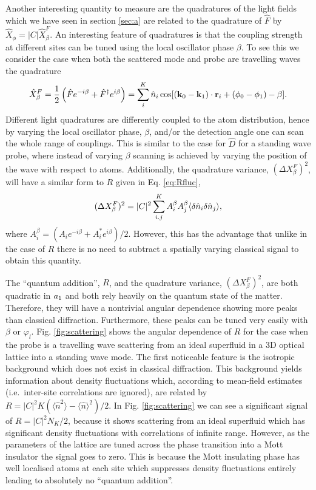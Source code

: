 Another interesting quantity to measure are the quadratures of the
light fields which we have seen in section \ref{sec:a} are related to
the quadrature of $\hat{F}$ by $\hat{X}_\phi = |C|
\hat{X}^F_\beta$. An interesting feature of quadratures is that the
coupling strength at different sites can be tuned using the local
oscillator phase $\beta$. To see this we consider the case when both
the scattered mode and probe are travelling waves the quadrature
\begin{equation} 
  \label{eq:Xtrav}
  \hat{X}^F_\beta = \frac{1}{2} \left( \hat{F} e^{-i \beta} +
    \hat{F}^\dagger e^{i \beta} \right) = \sum_i^K \hat{n}_i\cos[(\mathbf{k}_0 - \mathbf{k}_1) \cdot
  \mathbf{r}_i + (\phi_0 - \phi_1) - \beta].
\end{equation} 
Different light quadratures are differently coupled to the atom
distribution, hence by varying the local oscillator phase, $\beta$,
and/or the detection angle one can scan the whole range of
couplings. This is similar to the case for $\hat{D}$ for a standing
wave probe, where instead of varying $\beta$ scanning is achieved by
varying the position of the wave with respect to atoms. Additionally,
the quadrature variance, $(\Delta X^F_\beta)^2$, will have a similar
form to $R$ given in Eq. \eqref{eq:Rfluc},
\begin{equation}
  (\Delta X^F_\beta)^2 = |C|^2 \sum_{i.j}^K A_i^\beta A_j^\beta
  \langle \delta \hat{n}_i \delta \hat{n}_j \rangle,
\end{equation}
where $A_i^\beta = (A_i e^{-i\beta} + A_i^* e^{i \beta})/2$.  However,
this has the advantage that unlike in the case of $R$ there is no need
to subtract a spatially varying classical signal to obtain this
quantity.

The ``quantum addition'', $R$, and the quadrature variance,
$(\Delta X^F_\beta)^2$, are both quadratic in $a_1$ and both rely
heavily on the quantum state of the matter. Therefore, they will have
a nontrivial angular dependence showing more peaks than classical
diffraction. Furthermore, these peaks can be tuned very easily with
$\beta$ or $\varphi_l$. Fig. \ref{fig:scattering} shows the angular
dependence of $R$ for the case when the probe is a travelling wave
scattering from an ideal superfluid in a 3D optical lattice into a
standing wave mode. The first noticeable feature is the isotropic
background which does not exist in classical diffraction. This
background yields information about density fluctuations which,
according to mean-field estimates (i.e.~inter-site correlations are
ignored), are related by
$R = |C|^2 K( \langle \hat{n}^2 \rangle - \langle \hat{n} \rangle^2
)/2$. In Fig. \ref{fig:scattering} we can see a significant signal of
$R = |C|^2 N_K/2$, because it shows scattering from an ideal
superfluid which has significant density fluctuations with
correlations of infinite range. However, as the parameters of the
lattice are tuned across the phase transition into a Mott insulator
the signal goes to zero. This is because the Mott insulating phase has
well localised atoms at each site which suppresses density
fluctuations entirely leading to absolutely no ``quantum addition''.

